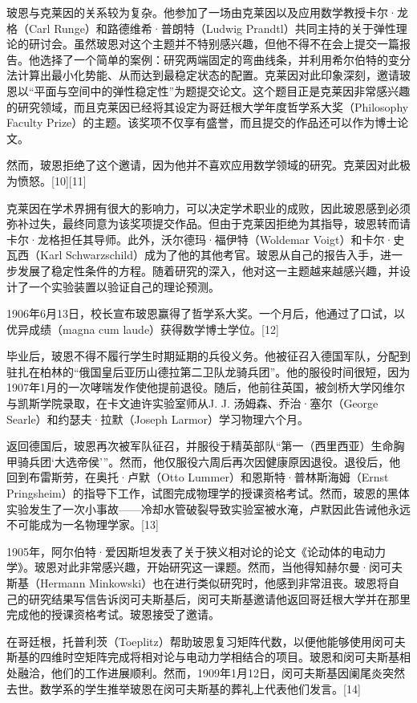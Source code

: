 玻恩与克莱因的关系较为复杂。他参加了一场由克莱因以及应用数学教授卡尔·龙格（Carl Runge）和路德维希·普朗特（Ludwig Prandtl）共同主持的关于弹性理论的研讨会。虽然玻恩对这个主题并不特别感兴趣，但他不得不在会上提交一篇报告。他选择了一个简单的案例：研究两端固定的弯曲线条，并利用希尔伯特的变分法计算出最小化势能、从而达到最稳定状态的配置。克莱因对此印象深刻，邀请玻恩以“平面与空间中的弹性稳定性”为题提交论文。这个题目正是克莱因非常感兴趣的研究领域，而且克莱因已经将其设定为哥廷根大学年度哲学系大奖（Philosophy Faculty Prize）的主题。该奖项不仅享有盛誉，而且提交的作品还可以作为博士论文。

然而，玻恩拒绝了这个邀请，因为他并不喜欢应用数学领域的研究。克莱因对此极为愤怒。[10][11]

克莱因在学术界拥有很大的影响力，可以决定学术职业的成败，因此玻恩感到必须弥补过失，最终同意为该奖项提交作品。但由于克莱因拒绝为其指导，玻恩转而请卡尔·龙格担任其导师。此外，沃尔德玛·福伊特（Woldemar Voigt）和卡尔·史瓦西（Karl Schwarzschild）成为了他的其他考官。玻恩从自己的报告入手，进一步发展了稳定性条件的方程。随着研究的深入，他对这一主题越来越感兴趣，并设计了一个实验装置以验证自己的理论预测。

1906年6月13日，校长宣布玻恩赢得了哲学系大奖。一个月后，他通过了口试，以优异成绩（magna cum laude）获得数学博士学位。[12]

毕业后，玻恩不得不履行学生时期延期的兵役义务。他被征召入德国军队，分配到驻扎在柏林的“俄国皇后亚历山德拉第二卫队龙骑兵团”。他的服役时间很短，因为1907年1月的一次哮喘发作使他提前退役。随后，他前往英国，被剑桥大学冈维尔与凯斯学院录取，在卡文迪许实验室师从J. J. 汤姆森、乔治·塞尔（George Searle）和约瑟夫·拉默（Joseph Larmor）学习物理六个月。

返回德国后，玻恩再次被军队征召，并服役于精英部队“第一（西里西亚）生命胸甲骑兵团‘大选帝侯’”。然而，他仅服役六周后再次因健康原因退役。退役后，他回到布雷斯劳，在奥托·卢默（Otto Lummer）和恩斯特·普林斯海姆（Ernst Pringsheim）的指导下工作，试图完成物理学的授课资格考试。然而，玻恩的黑体实验发生了一次小事故——冷却水管破裂导致实验室被水淹，卢默因此告诫他永远不可能成为一名物理学家。[13]

1905年，阿尔伯特·爱因斯坦发表了关于狭义相对论的论文《论动体的电动力学》。玻恩对此非常感兴趣，开始研究这一课题。然而，当他得知赫尔曼·闵可夫斯基（Hermann Minkowski）也在进行类似研究时，他感到非常沮丧。玻恩将自己的研究结果写信告诉闵可夫斯基后，闵可夫斯基邀请他返回哥廷根大学并在那里完成他的授课资格考试。玻恩接受了邀请。

在哥廷根，托普利茨（Toeplitz）帮助玻恩复习矩阵代数，以便他能够使用闵可夫斯基的四维时空矩阵完成将相对论与电动力学相结合的项目。玻恩和闵可夫斯基相处融洽，他们的工作进展顺利。然而，1909年1月12日，闵可夫斯基因阑尾炎突然去世。数学系的学生推举玻恩在闵可夫斯基的葬礼上代表他们发言。[14]

